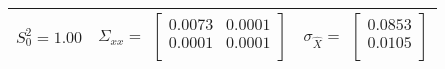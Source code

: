\begin{table}[H]
\centering
\begin{tabular}{|c|c|c|}
\toprule
$S_0^2 = 1.00$ & %
$\Sigma_{xx} = $ $
 \begin{bmatrix}
0.0073&0.0001\\
0.0001&0.0001\\
\end{bmatrix}
$
& %
$\sigma_{\hat{X}} = $ $
 \begin{bmatrix}
0.0853\\
0.0105\\
\end{bmatrix}
$
\\ %
\bottomrule
\end{tabular}
\end{table}
